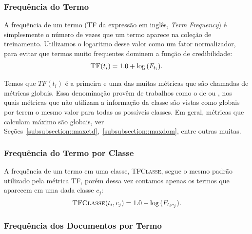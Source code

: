 \subsubsection{Frequência do Termo} %
\label{subsubsection::sumtf}

A frequência de um termo (\textsc{TF} da expressão em inglês, \textit{Term Frequency}) é simplesmente o número de vezes que um termo aparece na coleção de treinamento. Utilizamos o logaritmo desse valor como um fator normalizador, para evitar que termos muito frequentes dominem a função de credibilidade:
\begin{equation}\label{eqn::sumtf}
   \textsc{TF}(t_i) = 1.0 + \log{ ( F_{t_i} ) }.
\end{equation}

Temos que $TF(t_i)$ é a primeira e uma das muitas métricas que são chamadas de métricas globais. Essa denominação provêm de trabalhos como o de \cite{Lan05} ou \cite{Liu09}, nos quais métricas que não utilizam a informação da classe são vistas como globais por terem o mesmo valor para todas as possíveis classes. Em geral, métricas que calculam máximo são globais, ver Seções~\ref{subsubsection::maxctd},~\ref{subsubsection::maxdom}, entre outras muitas.

\subsubsection{Frequência do Termo por Classe} %
\label{subsubsection::tf}

A frequência de um termo em uma classe, \textsc{TFClasse}, segue o mesmo padrão utilizado pela métrica \textsc{TF}, porém dessa vez contamos apenas os termos que aparecem em uma dada classe $c_j$:
\begin{equation}\label{eqn::tf}
  \textsc{TFClasse}(t_i, c_j) = 1.0 + \log{ ( F_{t_ic_j} ) }.
\end{equation}


\subsubsection{Frequência dos Documentos por Termo}%
\label{subsubsection::df}

